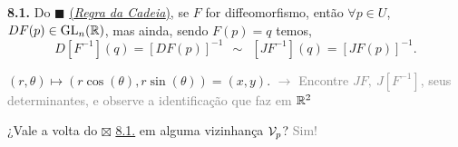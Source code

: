 \hypertarget{corol81}{}
\begin{corollary}
    \textbf{8.1.} Do \(\blacksquare\) \hyperlink{thmRDC}{(\emph{Regra da Cadeia})}, se \(F\) for diffeomorfismo, então \(\forall p \in U\), \(DF(p)\in \operatorname{GL}_n(\mathbb{R})\), mas ainda, sendo \(F(p)=q\) temos,  
    \[D[F^{-1}](q) = [DF(p)]^{-1}  \ \ \sim \ \   [JF^{-1}](q) = [JF(p)]^{-1}.\]
\end{corollary}

\begin{example}
    \((r,\theta) \mapsto (r\cos(\theta), r\sin(\theta))= (x,y)\). \textcolor{gray}{\(\rightarrow\) Encontre \(JF, \ J[F^{-1}]\), seus determinantes, e observe a identificação que faz em \(\mathbb{R}^2\)} 
\end{example}
\begin{note}
    ¿Vale a volta do {\scriptsize \(\boxtimes\)} \hyperlink{corol81}{8.1.} em alguma vizinhança $\mathcal{V}_p$? \textcolor{gray}{ Sim! }
\end{note}

